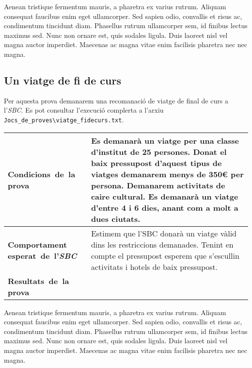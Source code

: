 \documentclass[11pt,a4paper]{article}
\begin{document}
Aenean tristique fermentum mauris, a pharetra ex varius rutrum. Aliquam consequat faucibus enim eget ullamcorper. Sed sapien odio, convallis et risus ac, condimentum tincidunt diam. Phasellus rutrum ullamcorper sem, id finibus lectus maximus sed. Nunc non ornare est, quis sodales ligula. Duis laoreet nisl vel magna auctor imperdiet. Maecenas ac magna vitae enim facilisis pharetra nec nec magna.


\subsection{Un viatge de fi de curs}
Per aquesta prova demanarem una recomanació de viatge de final de curs a l'\emph{SBC}. Es pot consultar l'execució complerta a l'arxiu \texttt{Jocs\_de\_proves\textbackslash viatge\_fidecurs.txt}.\\

\noindent
\begin{tabular}{|p{}|p{}|}
\hline
\textbf{\mbox{Condicions de la} \mbox{prova}} & Es demanarà un viatge per una classe d'institut de 25 persones. Donat el baix pressupost d'aquest tipus de viatges demanarem menys de 350\euro{} per persona. Demanarem activitats de caire cultural. Es demanarà un viatge d'entre 4 i 6 dies, anant com a molt a dues ciutats.\\
\hline
\textbf{Comportament \mbox{esperat de l'\emph{SBC}}} & Estimem que l'SBC donarà un viatge vàlid dins les restriccions demanades. Tenint en compte el pressupost esperem que s'escullin activitats i hotels de baix pressupost. \\
\hline
\textbf{\mbox{Resultats de la} \mbox{prova}} & \\
\hline
\end{tabular}

Aenean tristique fermentum mauris, a pharetra ex varius rutrum. Aliquam consequat faucibus enim eget ullamcorper. Sed sapien odio, convallis et risus ac, condimentum tincidunt diam. Phasellus rutrum ullamcorper sem, id finibus lectus maximus sed. Nunc non ornare est, quis sodales ligula. Duis laoreet nisl vel magna auctor imperdiet. Maecenas ac magna vitae enim facilisis pharetra nec nec magna.

\end{document}
